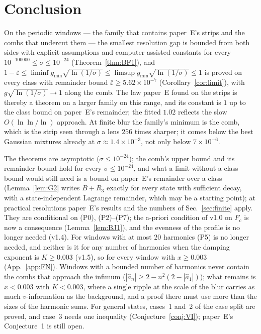 \section{Conclusion}
\label{sec:conclusion}

On the periodic windows --- the family that contains paper~E's strips and the combs that undercut them --- the smallest resolution gap
is bounded from both sides with explicit assumptions and computer-assisted constants for every $10^{-100000}\le\sigma\le10^{-24}$
(Theorem~\ref{thm:BF1}), and $1-\bar\varepsilon\le\liminf g_{\min}\sqrt{\ln(1/\sigma)}\le\limsup g_{\min}\sqrt{\ln(1/\sigma)}\le1$ is proved on every class with remainder bound $\bar\varepsilon\ge5.62\times10^{-7}$ (Corollary~\ref{cor:limit}), with $g\sqrt{\ln(1/\sigma)}\to1$ along the comb. The law paper~E found on the strips is thereby a theorem on a larger family on this range, and its constant is $1$ up to the class bound on paper~E's remainder; the fitted
$1.02$ reflects the slow $O(\ln\ln/\ln)$ approach. At finite blur the family's minimum is the comb, which is the strip seen through a lens
$256$ times sharper; it comes below the best Gaussian mixtures already at $\sigma\approx1.4\times10^{-3}$, not only below $7\times10^{-6}$.

The theorems are asymptotic ($\sigma\le10^{-24}$); the comb's upper bound and its remainder bound hold for every $\sigma\le10^{-24}$, and what a limit
without a class bound would still need is a bound on paper~E's remainder over a class (Lemma~\ref{lem:G2} writes $B+R_3$ exactly for every state with sufficient decay, with a state-independent Lagrange remainder, which may be a starting point); at practical resolutions paper~E's results and the numbers of Sec.~\ref{sec:finite} apply.
They are conditional on (P0), (P2)--(P7); the a-priori condition of v1.0 on $F_c$ is now a consequence (Lemma~\ref{lem:BJ1}), and the evenness of the profile is no longer needed (v1.4). For windows with at most $20$ harmonics (P5) is no longer needed, and neither is it for any number of harmonics when the damping exponent is $K\ge0.003$
(v1.5), so for every window with $x\ge0.003$ (App.~\ref{app:FN}). Windows with a bounded number of harmonics never contain the combs that approach the infimum
($|\hat a_n|\ge2-n^2(2-|\hat a_1|)$); what remains is $x<0.003$ with $K<0.003$, where a single ripple at the scale of the blur carries as much $v$-information as
the background, and a proof there must use more than the sizes of the harmonic sums.
For general states, cases~1 and~2 of the case split are proved, and case~3 needs one inequality (Conjecture~\ref{conj:VI}); paper~E's
Conjecture~1 is still open.

